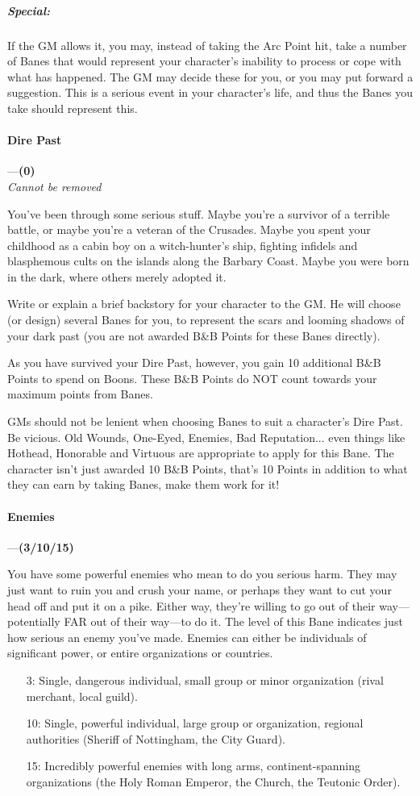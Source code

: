 \documentclass[oneside,11pt,english]{book}
\begin{document}
\subparagraph{Special:} If the GM allows it, you may, instead of taking the Arc Point hit, take a number of Banes that would represent your character’s inability to process or cope with what has happened. The GM may decide these for you, or you may put forward a suggestion. This is a serious event in your character’s life, and thus the Banes you take should represent this.
\paragraph{\label{bane:Dire Past}Dire Past}---\quad\textbf{(0) }\\
\emph{Cannot be removed}\par
You've been through some serious stuff. Maybe you're a survivor of a terrible battle, or maybe you're a veteran of the Crusades. Maybe you spent your childhood as a cabin boy on a witch-hunter's ship, fighting infidels and blasphemous cults on the islands along the Barbary Coast. Maybe you were born in the dark, where others merely adopted it.


Write or explain a brief backstory for your character to the GM. He will choose (or design) several Banes 
for you, to represent the scars and looming shadows of your dark past (you are not awarded B\&B Points 
for these Banes directly).


As you have survived your Dire Past, however, you gain 10 additional B\&B Points to spend on Boons. 
These B\&B Points do NOT count towards your maximum points from Banes. 


GMs should not be lenient when choosing Banes to suit a character’s Dire Past. Be vicious. Old Wounds, 
One-Eyed, Enemies, Bad Reputation... even things like Hothead, Honorable and Virtuous are appropriate 
to apply for this Bane. The character isn’t just awarded 10 B\&B Points, that’s 10 Points in addition to what they can earn by taking Banes, make them work for it! 
\paragraph{\label{bane:Enemies}Enemies}---\quad\textbf{(3/10/15) }\par
You have some powerful enemies who mean to do you serious harm. They may just want to ruin you and 
crush your name, or perhaps they want to cut your head off and put it on a pike. Either way, they're 
willing to go out of their way—potentially FAR out of their way—to do it. The level of this Bane 
indicates just how serious an enemy you've made. Enemies can either be individuals of significant power, or entire organizations or countries. 
\begin{itemize}
	\item [3:] Single, dangerous individual, small group or minor organization (rival merchant, local guild). 
	\item [10:] Single, powerful individual, large group or organization, regional authorities (Sheriff of Nottingham, the City Guard).
	\item [15:] Incredibly powerful enemies with long arms, continent-spanning organizations (the Holy Roman Emperor, the Church, the Teutonic Order).
\end{itemize}
\end{document}
